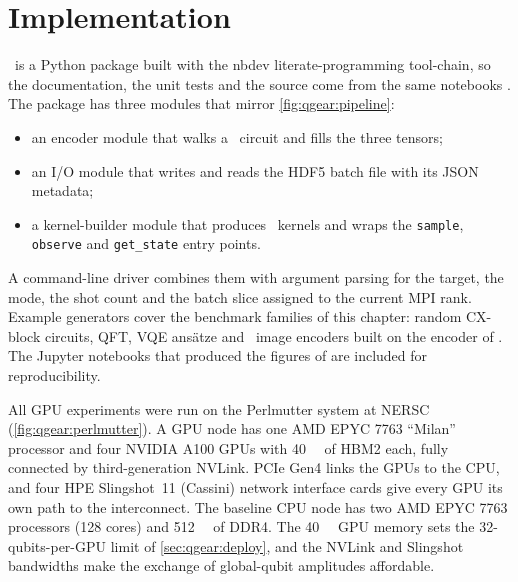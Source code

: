 \section{Implementation}\label{sec:qgear:impl}

\qgear\ is a Python package built with the nbdev literate-programming tool-chain, so the documentation, the unit tests and the source come from the same notebooks \cite{guo2025qgearsoftware}. The package has three modules that mirror \cref{fig:qgear:pipeline}:
\begin{itemize}
  \item an encoder module that walks a \qiskit\ circuit and fills the three tensors;
  \item an I/O module that writes and reads the HDF5 batch file with its JSON metadata;
  \item a kernel-builder module that produces \cudaq\ kernels and wraps the \texttt{sample}, \texttt{observe} and \texttt{get\_state} entry points.
\end{itemize}
A command-line driver combines them with argument parsing for the target, the mode, the shot count and the batch slice assigned to the current MPI rank. Example generators cover the benchmark families of this chapter: random CX-block circuits, QFT, VQE ans\"atze and \qcrank\ image encoders built on the encoder of \cite{balewski2024qcrank}. The Jupyter notebooks that produced the figures of \cite{guo2025qgear} are included for reproducibility.

All GPU experiments were run on the Perlmutter system at NERSC (\cref{fig:qgear:perlmutter}). A GPU node has one AMD EPYC 7763 ``Milan'' processor and four NVIDIA A100 GPUs with \SI{40}{\giga\byte} of HBM2 each, fully connected by third-generation NVLink. PCIe Gen4 links the GPUs to the CPU, and four HPE Slingshot~11 (Cassini) network interface cards give every GPU its own path to the interconnect. The baseline CPU node has two AMD EPYC 7763 processors (128 cores) and \SI{512}{\giga\byte} of DDR4. The \SI{40}{\giga\byte} GPU memory sets the 32-qubits-per-GPU limit of \cref{sec:qgear:deploy}, and the NVLink and Slingshot bandwidths make the exchange of global-qubit amplitudes affordable.

